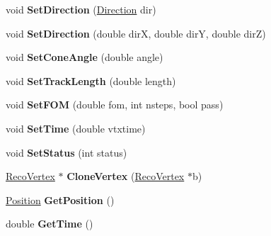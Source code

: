 \begin{DoxyCompactItemize}
\item 
\hypertarget{classRecoVertex_a297cc2a448a138af57a9698e7979fdc3}{
void {\bfseries SetDirection} (\hyperlink{classDirection}{Direction} dir)}
\label{classRecoVertex_a297cc2a448a138af57a9698e7979fdc3}

\item 
\hypertarget{classRecoVertex_abdebdcee7b218ddcf0cc2376f4374c6a}{
void {\bfseries SetDirection} (double dirX, double dirY, double dirZ)}
\label{classRecoVertex_abdebdcee7b218ddcf0cc2376f4374c6a}

\item 
\hypertarget{classRecoVertex_ab5915f773f79307ecbff0d33b909428a}{
void {\bfseries SetConeAngle} (double angle)}
\label{classRecoVertex_ab5915f773f79307ecbff0d33b909428a}

\item 
\hypertarget{classRecoVertex_a77b91d56b5561e736877b48b0d12d0b7}{
void {\bfseries SetTrackLength} (double length)}
\label{classRecoVertex_a77b91d56b5561e736877b48b0d12d0b7}

\item 
\hypertarget{classRecoVertex_a49dccbc57793bb7db34e345377802283}{
void {\bfseries SetFOM} (double fom, int nsteps, bool pass)}
\label{classRecoVertex_a49dccbc57793bb7db34e345377802283}

\item 
\hypertarget{classRecoVertex_aa2d7a563db1be14ae5538dcc678a80d0}{
void {\bfseries SetTime} (double vtxtime)}
\label{classRecoVertex_aa2d7a563db1be14ae5538dcc678a80d0}

\item 
\hypertarget{classRecoVertex_af0040136fde1055f38e6c735daeab3a6}{
void {\bfseries SetStatus} (int status)}
\label{classRecoVertex_af0040136fde1055f38e6c735daeab3a6}

\item 
\hypertarget{classRecoVertex_a99b74138ad6c4bf38f0a9ad57cac005a}{
\hyperlink{classRecoVertex}{RecoVertex} $\ast$ {\bfseries CloneVertex} (\hyperlink{classRecoVertex}{RecoVertex} $\ast$b)}
\label{classRecoVertex_a99b74138ad6c4bf38f0a9ad57cac005a}

\item 
\hypertarget{classRecoVertex_a6963afc449afb852e849b6886b276c74}{
\hyperlink{classPosition}{Position} {\bfseries GetPosition} ()}
\label{classRecoVertex_a6963afc449afb852e849b6886b276c74}

\item 
\hypertarget{classRecoVertex_a6d78ff11288221dc2e4b43d3863113a9}{
double {\bfseries GetTime} ()}
\label{classRecoVertex_a6d78ff11288221dc2e4b43d3863113a9}


\end{DoxyCompactItemize}
